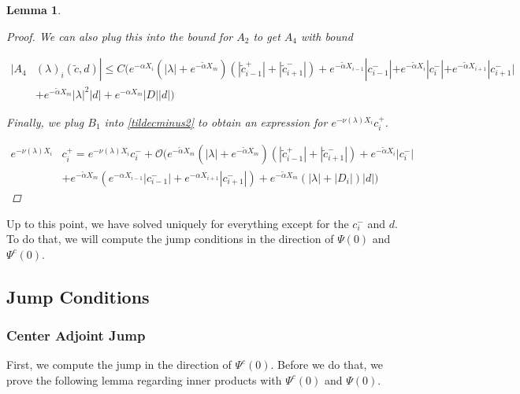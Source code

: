 \documentclass[12pt]{article}
\newtheorem{lemma}{Lemma}
\begin{document}
\begin{lemma}
\begin{proof}
We can also plug this into the bound for $A_2$ to get $A_4$ with bound

\begin{align*}
|A_4&(\lambda)_i(\tilde{c}, d)|
\leq C \Big( 
e^{-\alpha X_i} (|\lambda| + e^{-\tilde{\alpha}X_m})(|\tilde{c}_{i-1}^+| + |\tilde{c}_{i+1}^-|) + e^{-\tilde{\alpha}X_{i-1}}|c_{i-1}^-| + e^{-\tilde{\alpha}X_i}|c_i^-| + e^{-\tilde{\alpha}X_{i+1}}|c_{i+1}^-| \\
&+ e^{-\tilde{\alpha} X_m} |\lambda|^2|d| + e^{-\alpha X_m}|D||d| \Big)
\end{align*} 

Finally, we plug $B_1$ into \eqref{tildecminus2} to obtain an expression for $e^{-\nu(\lambda)X_i} c_i^+$.

\begin{align*}
e^{-\nu(\lambda)X_i} &c_i^+ = e^{-\nu(\lambda)X_i} c_i^- 
+ \mathcal{O}\Big( e^{-\tilde{\alpha}X_m} (|\lambda| + e^{-\tilde{\alpha}X_m})( |\tilde{c}_{i-1}^+| + |\tilde{c}_{i+1}^-|) 
+ e^{-\tilde{\alpha}X_i}|c_i^-| \\
&+ e^{-\tilde{\alpha}X_m}( e^{-\alpha X_{i-1}}|c_{i-1}^-| + e^{-\alpha X_{i+1}}|c_{i+1}^-| ) + e^{-\tilde{\alpha}X_m}(|\lambda| + |D_i|)|d| \Big)
\end{align*}

\end{proof}
\end{lemma}

Up to this point, we have solved uniquely for everything except for the $c_i^-$ and $d$. To do that, we will compute the jump conditions in the direction of $\Psi(0)$ and $\Psi^c(0)$.

\subsection{Jump Conditions}

\subsubsection{Center Adjoint Jump}

First, we compute the jump in the direction of $\Psi^c(0)$. Before we do that, we prove the following lemma regarding inner products with $\Psi^c(0)$ and $\Psi(0)$.

\end{document}
